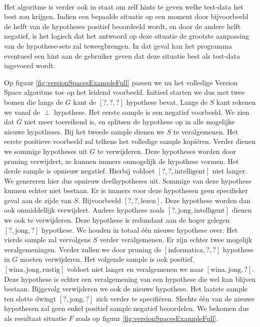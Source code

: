 \paragraph{}
Het algoritme is verder ook in staat om zelf hints te geven welke test-data het best zou krijgen. Indien een bepaalde situatie op een moment door bijvoorbeeld de helft van de hypotheses positief beoordeeld wordt, en door de andere helft negatief, is het logisch dat het antwoord op deze situatie de grootste aanpassing van de hypothese-sets zal teweegbrengen. In dat geval kan het programma eventueel een hint aan de gebruiker geven dat deze situatie best als test-data ingevoerd wordt.
\begin{leftbar}
Op figuur \ref{fig:versionSpacesExampleFull} passen we nu het volledige Version Space algoritme toe op het leidend voorbeeld. Initieel starten we dus met twee bomen die langs de $G$ kant de $\left[?,?,?\right]$ hypothese bevat. Langs de $S$ kant rekenen we vanaf de $\perp$ hypothese. Het eerste sample is een negatief voorbeeld. We zien dat $G$ niet meer toereikend is, en splitsen de hypothese op in alle mogelijke nieuwe hypotheses. Bij het tweede sample dienen we $S$ te veralgemenen. Het eerste positieve voorbeeld zal telkens het volledige sample kopiëren. Verder dienen we sommige hypotheses uit $G$ te verwijderen. Deze hypotheses worden door pruning verwijdert, ze kunnen immers onmogelijk de hypothese vormen. Het derde sample is opnieuw negatief. Hierbij voldoet $\left[?,?,\mbox{intelligent}\right]$ niet langer. We genereren hier dus opnieuw deelhypotheses uit. Sommige van deze hypothese kunnen echter niet bestaan. Er is immers voor deze hypothesen geen specifieker geval aan de zijde van $S$. Bijvoorbeeld $\left[?,?,\mbox{lezen}\right]$. Deze hypothese worden dan ook onmiddellijk verwijdert. Andere hypothese zoals $\left[?,\mbox{jong},\mbox{intelligent}\right]$ dienen we ook te verwijderen. Deze hypothese is redundant aan de hoger gelegen $\left[?,\mbox{jong},?\right]$ hypothese. We houden in totaal één nieuwe hypothese over. Het vierde sample zal vervolgens $S$ verder veralgemenen. Er zijn echter twee mogelijk veralgemeningen. Verder zullen we door pruning de $\left[\mbox{informatica},?,?\right]$ hypothese in $G$ moeten verwijderen. Het volgende sample is ook positief. $\left[\mbox{wina},\mbox{jong},\mbox{rustig}\right]$ voldoet niet langer en veralgemenen we naar $\left[\mbox{wina},\mbox{jong},?\right]$. Deze hypothese is echter een veralgemening van een hypothese die wel kan blijven bestaan. Bijgevolg verwijderen we ook de nieuwe hypothese. Het laatste sample ten slotte dwingt $\left[?,\mbox{jong},?\right]$ zich verder te specifiëren. Slechts één van de nieuwe hypothesen zal geen enkel positief sample negatief beoordelen. We bekomen dus als resultaat situatie $F$ zoals op figuur \ref{fig:versionSpacesExampleFull}.
\end{leftbar}
